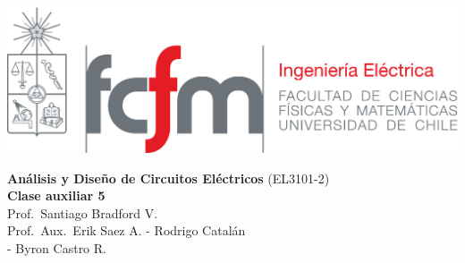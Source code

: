 \documentclass[
  11pt,
  letterpaper,
   addpoints,
   answers
  ]{exam}
\begin{document}
\noindent
\begin{minipage}{0.47\textwidth}
\includegraphics[width=\textwidth]{../fcfm_die}
\end{minipage}
\begin{minipage}{0.53\textwidth}
    
\begin{center} 
\large\textbf{Análisis y Diseño de Circuitos Eléctricos} (EL3101-2) \\
\large\textbf{Clase auxiliar 5} \\
\normalsize Prof.~Santiago Bradford V.\\
\normalsize Prof.~Aux.~Erik Saez A. - Rodrigo Catalán\\
             - Byron Castro R.
\end{center}
\end{minipage}

\vspace{0.5cm}
\noindent
\vspace{.85cm}
\end{document}
